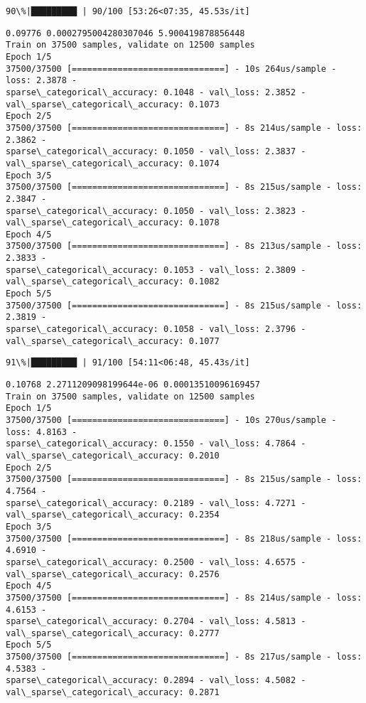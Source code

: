 \documentclass[11pt]{article}
\begin{document}
    \begin{Verbatim}[commandchars=\\\{\}]
 90\%|█████████ | 90/100 [53:26<07:35, 45.53s/it]
    \end{Verbatim}

    \begin{Verbatim}[commandchars=\\\{\}]
0.09776 0.0002795004280307046 5.900419878856448
Train on 37500 samples, validate on 12500 samples
Epoch 1/5
37500/37500 [==============================] - 10s 264us/sample - loss: 2.3878 -
sparse\_categorical\_accuracy: 0.1048 - val\_loss: 2.3852 -
val\_sparse\_categorical\_accuracy: 0.1073
Epoch 2/5
37500/37500 [==============================] - 8s 214us/sample - loss: 2.3862 -
sparse\_categorical\_accuracy: 0.1050 - val\_loss: 2.3837 -
val\_sparse\_categorical\_accuracy: 0.1074
Epoch 3/5
37500/37500 [==============================] - 8s 215us/sample - loss: 2.3847 -
sparse\_categorical\_accuracy: 0.1050 - val\_loss: 2.3823 -
val\_sparse\_categorical\_accuracy: 0.1078
Epoch 4/5
37500/37500 [==============================] - 8s 213us/sample - loss: 2.3833 -
sparse\_categorical\_accuracy: 0.1053 - val\_loss: 2.3809 -
val\_sparse\_categorical\_accuracy: 0.1082
Epoch 5/5
37500/37500 [==============================] - 8s 215us/sample - loss: 2.3819 -
sparse\_categorical\_accuracy: 0.1058 - val\_loss: 2.3796 -
val\_sparse\_categorical\_accuracy: 0.1077
    \end{Verbatim}

    \begin{Verbatim}[commandchars=\\\{\}]
 91\%|█████████ | 91/100 [54:11<06:48, 45.43s/it]
    \end{Verbatim}

    \begin{Verbatim}[commandchars=\\\{\}]
0.10768 2.2711209098199644e-06 0.00013510096169457
Train on 37500 samples, validate on 12500 samples
Epoch 1/5
37500/37500 [==============================] - 10s 270us/sample - loss: 4.8163 -
sparse\_categorical\_accuracy: 0.1550 - val\_loss: 4.7864 -
val\_sparse\_categorical\_accuracy: 0.2010
Epoch 2/5
37500/37500 [==============================] - 8s 215us/sample - loss: 4.7564 -
sparse\_categorical\_accuracy: 0.2189 - val\_loss: 4.7271 -
val\_sparse\_categorical\_accuracy: 0.2354
Epoch 3/5
37500/37500 [==============================] - 8s 218us/sample - loss: 4.6910 -
sparse\_categorical\_accuracy: 0.2500 - val\_loss: 4.6575 -
val\_sparse\_categorical\_accuracy: 0.2576
Epoch 4/5
37500/37500 [==============================] - 8s 214us/sample - loss: 4.6153 -
sparse\_categorical\_accuracy: 0.2704 - val\_loss: 4.5813 -
val\_sparse\_categorical\_accuracy: 0.2777
Epoch 5/5
37500/37500 [==============================] - 8s 217us/sample - loss: 4.5383 -
sparse\_categorical\_accuracy: 0.2894 - val\_loss: 4.5082 -
val\_sparse\_categorical\_accuracy: 0.2871
    \end{Verbatim}
\end{document}
